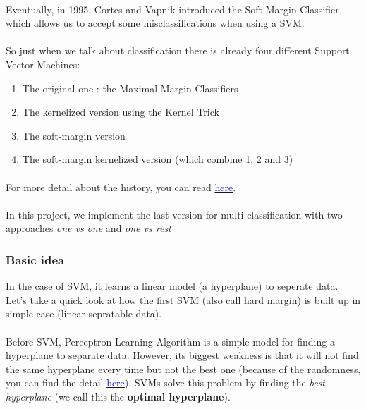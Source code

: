 \paragraph*{}
Eventually, in 1995, Cortes and Vapnik introduced the Soft Margin Classifier which allows us to accept some misclassifications when using a SVM.

\paragraph*{}
So just when we talk about classification there is already four different Support Vector Machines:
\begin{enumerate}
\item The original one : the Maximal Margin Classifiers
\item The kernelized version using the Kernel Trick
\item The soft-margin version
\item The soft-margin kernelized version (which combine 1, 2 and 3)
\end{enumerate}

\paragraph*{}
For more detail about the history, you can read \href{http://www.svms.org/history.html}{\textcolor{blue}{here}}.

\paragraph*{}
In this project, we implement the last version for multi-classification with two approaches \textit{one vs one} and \textit{one vs rest} 

\subsubsection*{Basic idea}
In the case of SVM, it learns a linear model (a hyperplane) to seperate data. Let's take a quick look at how the first SVM (also call hard margin) is built up in simple case (linear sepratable data).
\paragraph*{} 
Before SVM, Perceptron Learning Algorithm is a simple model for finding a hyperplane to separate data. However, its biggest weakness is that it will not find the same hyperplane every time but not the best one (because of the randomness, you can find the detail \href{https://en.wikipedia.org/wiki/Perceptron}{\textcolor{blue}{here}}). SVMs solve this problem by finding the \textit{best hyperplane} (we call this the \textbf{optimal hyperplane}).

